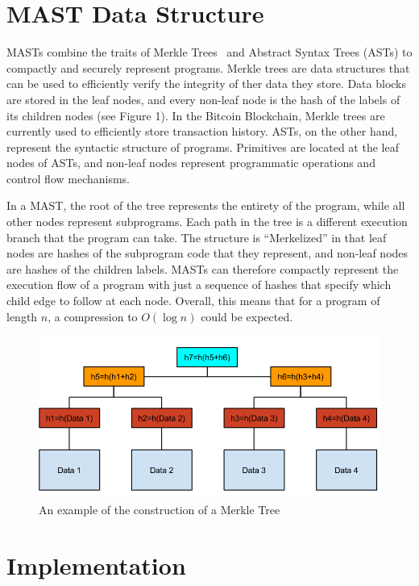 \documentclass{vldb}
\begin{document}
\section{MAST Data Structure}

MASTs combine the traits of Merkle Trees~\cite{merkle} and Abstract Syntax
Trees (ASTs) to compactly and securely represent programs. Merkle trees are
data structures that can be used to efficiently verify the integrity of ther
data they store.  Data blocks are stored in the leaf nodes, and every non-leaf
node is the hash of the labels of its children nodes (see Figure 1). In the
Bitcoin Blockchain, Merkle trees are currently used to efficiently store
transaction history. ASTs, on the other hand, represent the syntactic structure
of programs. Primitives are located at the leaf nodes of ASTs, and non-leaf
nodes represent programmatic operations and control flow mechanisms.
 
In a MAST, the root of the tree represents the entirety of the program, while
all other nodes represent subprograms. Each path in the tree is a different
execution branch that the program can take. The structure is “Merkelized” in
that leaf nodes are hashes of the subprogram code that they represent, and
non-leaf nodes are hashes of the children labels. MASTs can therefore compactly
represent the execution flow of a program with just a sequence of hashes that
specify which child edge to follow at each node. Overall, this means that for
a program of length $n$, a compression to $O(\log{}n)$ could be expected.

\begin{figure}[h]
	\includegraphics[scale=.4]{merkle_tree}
	\caption{An example of the construction of a Merkle Tree}
	\label{system}
\end{figure}

\section{Implementation}
\end{document}

